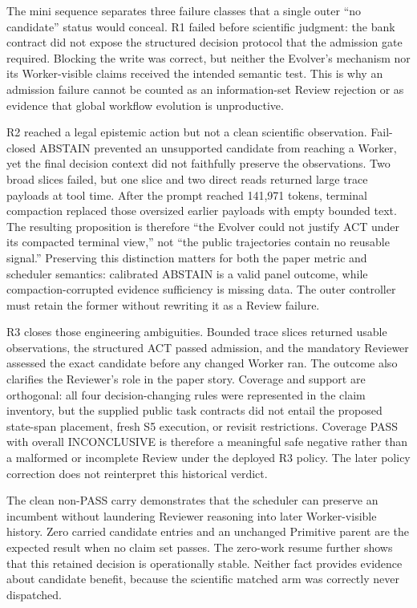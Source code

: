 The mini sequence separates three failure classes that a single outer
``no candidate'' status would conceal. R1 failed before scientific judgment:
the bank contract did not expose the structured decision protocol that the
admission gate required. Blocking the write was correct, but neither the
Evolver's mechanism nor its Worker-visible claims received the intended
semantic test. This is why an admission failure cannot be counted as an
information-set Review rejection or as evidence that global workflow evolution
is unproductive.

R2 reached a legal epistemic action but not a clean scientific observation.
Fail-closed ABSTAIN prevented an unsupported candidate from reaching a Worker,
yet the final decision context did not faithfully preserve the observations.
Two broad slices failed, but one slice and two direct reads returned large trace
payloads at tool time. After the prompt reached 141,971 tokens, terminal
compaction replaced those oversized earlier payloads with empty bounded text.
The resulting proposition is therefore ``the Evolver could not justify ACT
under its compacted terminal view,'' not ``the public trajectories contain no
reusable signal.'' Preserving this distinction matters for both the paper
metric and scheduler semantics: calibrated ABSTAIN is a valid panel outcome,
while compaction-corrupted evidence sufficiency is missing data. The outer
controller must retain the former without rewriting it as a Review failure.

R3 closes those engineering ambiguities. Bounded trace slices returned usable
observations, the structured ACT passed admission, and the mandatory Reviewer
assessed the exact candidate before any changed Worker ran. The outcome also
clarifies the Reviewer's role in the paper story. Coverage and support are
orthogonal: all four decision-changing rules were represented in the claim
inventory, but the supplied public task contracts did not entail the proposed
state-span placement, fresh S5 execution, or revisit restrictions. Coverage
PASS with overall INCONCLUSIVE is therefore a meaningful safe negative rather
than a malformed or incomplete Review under the deployed R3 policy. The later
policy correction does not reinterpret this historical verdict.

The clean non-PASS carry demonstrates that the scheduler can preserve an
incumbent without laundering Reviewer reasoning into later Worker-visible
history. Zero carried candidate entries and an unchanged Primitive parent are
the expected result when no claim set passes. The zero-work resume further
shows that this retained decision is operationally stable. Neither fact
provides evidence about candidate benefit, because the scientific matched arm
was correctly never dispatched.

